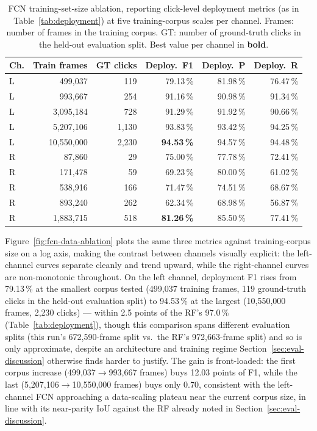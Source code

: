 \begin{table}[t]
\centering
\small
\caption{FCN training-set-size ablation, reporting click-level deployment metrics
(as in Table~\ref{tab:deployment}) at five training-corpus scales per channel.
Frames: number of frames in the training corpus. GT: number of ground-truth
clicks in the held-out evaluation split. Best value per channel in \textbf{bold}.}
\label{tab:fcn-data-ablation}
\begin{tabular}{lrrrrr}
\toprule
\textbf{Ch.} & \textbf{Train frames} & \textbf{GT clicks} & \textbf{Deploy.\ F1} & \textbf{Deploy.\ P} & \textbf{Deploy.\ R} \\
\midrule
L & 499,037    & 119  & 79.13\,\% & 81.98\,\% & 76.47\,\% \\
L & 993,667    & 254  & 91.16\,\% & 90.98\,\% & 91.34\,\% \\
L & 3,095,184  & 728  & 91.29\,\% & 91.92\,\% & 90.66\,\% \\
L & 5,207,106  & 1,130 & 93.83\,\% & 93.42\,\% & 94.25\,\% \\
L & 10,550,000 & 2,230 & \textbf{94.53\,\%} & 94.57\,\% & 94.48\,\% \\
\midrule
R & 87,860    & 29   & 75.00\,\% & 77.78\,\% & 72.41\,\% \\
R & 171,478   & 59   & 69.23\,\% & 80.00\,\% & 61.02\,\% \\
R & 538,916   & 166  & 71.47\,\% & 74.51\,\% & 68.67\,\% \\
R & 893,240   & 262  & 62.34\,\% & 68.98\,\% & 56.87\,\% \\
R & 1,883,715 & 518  & \textbf{81.26\,\%} & 85.50\,\% & 77.41\,\% \\
\bottomrule
\end{tabular}
\end{table}



Figure~\ref{fig:fcn-data-ablation} plots the same three metrics against
training-corpus size on a log axis, making the contrast between channels
visually explicit: the left-channel curves separate cleanly and trend upward,
while the right-channel curves are non-monotonic throughout. On the left
channel, deployment F1 rises from 79.13\,\% at the smallest corpus tested
(499,037 training frames, 119 ground-truth clicks in the held-out evaluation
split) to 94.53\,\% at the largest (10,550,000 frames, 2,230 clicks) --- within
2.5 points of the RF's 97.0\,\% (Table~\ref{tab:deployment}), though this
comparison spans different evaluation splits (this run's 672,590-frame split
vs.\ the RF's 972,663-frame split) and so is only approximate, despite an
architecture and training regime
Section~\ref{sec:eval-discussion} otherwise finds harder to justify. The gain
is front-loaded: the first corpus increase (499,037$\to$993,667 frames) buys
12.03 points of F1, while the last (5,207,106$\to$10,550,000 frames) buys only
0.70, consistent with the left-channel FCN approaching a data-scaling plateau
near the current corpus size, in line with its near-parity IoU against the RF
already noted in Section~\ref{sec:eval-discussion}.

